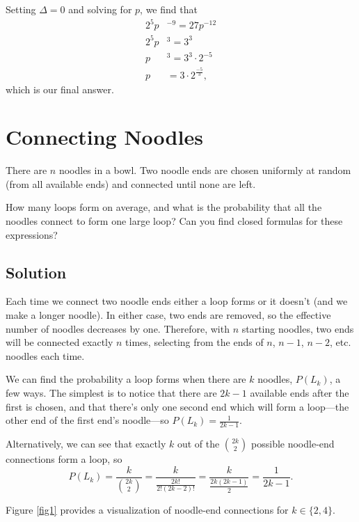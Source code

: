 \documentclass{book}
\begin{document}
Setting $\Delta = 0$ and solving for $p$, we find that
\begin{align*}
2^5p&^{-9} = 27p^{-12}\\
2^5p&^3 = 3^3\\
p&^3 = 3^3\cdot 2^{-5}\\
p& = 3\cdot 2^{\frac{-5}{3}},
\end{align*}
which is our final answer.
\chapter{Connecting Noodles}
There are $n$ noodles in a bowl. Two noodle ends are chosen uniformly at random (from all available ends)
and connected until none are left.

\begin{question*}
  How many loops form on average, and
  what is the probability that all the noodles connect to form one large loop? Can you find closed formulas for these expressions?
  \end{question*}

\section{Solution}
Each time we connect two noodle ends either a loop forms or it doesn't (and we make a longer noodle). In either case, two ends are removed,
so the effective number of noodles decreases by one. Therefore, with $n$ starting noodles, two ends will be connected exactly $n$ times, selecting
from the ends of $n$, $n-1$, $n-2$, etc. noodles each time.

We can find the probability a loop forms when there are $k$ noodles, $P(L_k)$, a few ways. The simplest is to notice that there are $2k-1$ available ends after the first is chosen, and that there's only one second end which will form a loop---the other end of
the first end's noodle---so $P(L_k)=\frac{1}{2k-1}$.

Alternatively, we can see that exactly $k$ out of the $\binom{2k}{2}$ possible noodle-end connections form a loop, so
\begin{equation}\label{plk}
P(L_k)=\frac{k}{\binom{2k}{2}} = \frac{k}{\frac{2k!}{2!(2k-2)!}} = \frac{k}{\frac{2k(2k-1)}{2}} = \frac{1}{2k-1}.
\end{equation}

Figure \ref{fig1} provides a visualization of noodle-end connections for $k\in\{2,4\}$.
\end{document}
